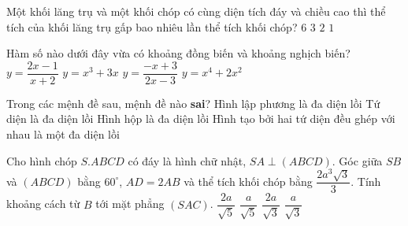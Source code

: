 \begin{ex}%
Một khối lăng trụ và một khối chóp có cùng diện tích đáy và chiều cao thì thể tích của khối lăng trụ gấp bao nhiêu lần thể tích khối chóp?
\choice
{$6$}
{\True $3$}
{$2$}
{$1$}
\end{ex}

\begin{ex}%
Hàm số nào dưới đây vừa có khoảng đồng biến và khoảng nghịch biến?
\choice
{$y=\dfrac{2x-1}{x+2}$}
{$y=x^3+3x$}
{$y=\dfrac{-x+3}{2x-3}$}
{\True $y=x^4+2x^2$}
\end{ex}

\begin{ex}%
Trong các mệnh đề sau, mệnh đề nào {\bf sai}?
\choice
{Hình lập phương là đa diện lồi}
{Tứ diện là đa diện lồi}
{Hình hộp là đa diện lồi}
{\True Hình tạo bởi hai tứ diện đều ghép với nhau là một đa diện lồi}
\end{ex}

\begin{ex}%
Cho hình chóp $S.ABCD$ có đáy là hình chữ nhật, $SA\perp (ABCD)$. Góc giữa $SB$ và $(ABCD)$ bằng $60^{\circ}$, $AD=2AB$ và thể tích khối chóp bằng $\dfrac{2a^3\sqrt{3}}{3}$. Tính khoảng cách từ $B$ tới mặt phẳng $(SAC)$.
\choice
{\True $\dfrac{2a}{\sqrt{5}}$}
{$\dfrac{a}{\sqrt{5}}$}
{$\dfrac{2a}{\sqrt{3}}$}
{$\dfrac{a}{\sqrt{3}}$} 
\end{ex}

